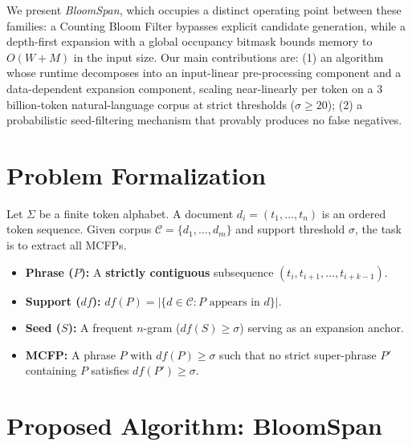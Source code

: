 \documentclass[runningheads]{llncs}
\begin{document}
    We present \emph{BloomSpan}, which occupies a distinct operating point between these families: a Counting Bloom Filter bypasses explicit candidate generation, while a depth-first expansion with a global occupancy bitmask bounds memory to $O(W + M)$ in the input size. Our main contributions are:  (1) an algorithm whose runtime decomposes into an input-linear pre-processing component and a data-dependent expansion component, scaling near-linearly per token on a 3 billion-token natural-language corpus at strict thresholds ($\sigma \geq 20$); (2) a probabilistic seed-filtering mechanism that provably produces no false negatives.


    \section{Problem Formalization}\label{sec:problem-formalization}

    Let $\Sigma$ be a finite token alphabet. A document $d_i = (t_1,\dots,t_n)$ is an ordered token sequence. Given corpus $\mathcal{C} = \{d_1,\dots,d_m\}$ and support threshold $\sigma$, the task is to extract all MCFPs.

    \begin{itemize}[noitemsep, topsep=0pt]
        \item \textbf{Phrase ($P$):} A \textbf{strictly contiguous} subsequence $(t_i, t_{i+1}, \dots, t_{i+k-1})$.
        \item \textbf{Support ($df$):} $df(P) = |\{d \in \mathcal{C} : P \text{ appears in } d\}|$.
        \item \textbf{Seed ($S$):} A frequent $n$-gram ($df(S) \ge \sigma$) serving as an expansion anchor.
        \item \textbf{MCFP:} A phrase $P$ with $df(P) \ge \sigma$ such that no strict super-phrase $P'$ containing $P$ satisfies $df(P') \ge \sigma$.
    \end{itemize}


    \section{Proposed Algorithm: BloomSpan}
\end{document}
